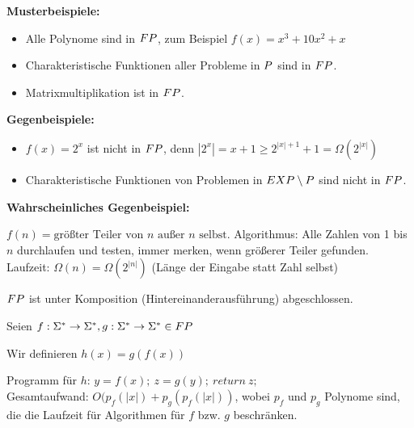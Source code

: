 \begin{beispiel}
    
    \textbf{Musterbeispiele:}

    \begin{itemize}
        \item Alle Polynome sind in $FP$, zum Beispiel $f(x) = x^3 + 10x^2 + x$
        \item Charakteristische Funktionen aller Probleme in $P$ sind in $FP$.
        \item Matrixmultiplikation ist in $FP$.
    \end{itemize}

    \textbf{Gegenbeispiele:}

    \begin{itemize}
        \item $f(x) = 2^x$ ist nicht in $FP$, denn $|2^x| = x + 1 \geq 2^{|x| + 1} +  1 = \Omega(2^{|x|})$
        \item Charakteristische Funktionen von Problemen in $EXP \setminus P$  sind nicht in $FP$.
    \end{itemize}

    \textbf{Wahrscheinliches Gegenbeispiel:}

    $f(n) = \text{größter Teiler von } n \text{ außer } n \text{ selbst.}$
    Algorithmus: Alle Zahlen von 1 bis $n$ durchlaufen und testen, immer merken, wenn größerer Teiler gefunden.\\
    Laufzeit: $\Omega(n) = \Omega(2^{|n|})$ (Länge der Eingabe statt Zahl selbst)

\end{beispiel}




\begin{satz}
    $FP$ ist unter Komposition (Hintereinanderausführung) abgeschlossen.\\
\end{satz}
\begin{beweis}
    
    Seien $ f: \Sigma^\ast \rightarrow \Sigma^\ast, g : \Sigma^\ast \rightarrow \Sigma^\ast \in FP $

    Wir definieren $h(x) = g(f(x))$

    Programm für $h$: $y = f(x);\ z = g(y);\ return\ z;$\\
    Gesamtaufwand: $O(p_f(|x|) + p_g(p_f(|x|))$, wobei $p_f$ und $p_g$ Polynome sind, die die Laufzeit für Algorithmen für $f$ bzw. $g$ beschränken.
\end{beweis}




